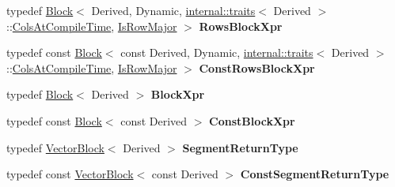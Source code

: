 \begin{DoxyCompactItemize}
\item 
\mbox{\label{class_eigen_1_1_dense_base_ad79e2820eb2d754fd40eff7f0e3609e3}} 
typedef \mbox{\hyperlink{class_eigen_1_1_block}{Block}}$<$ Derived, Dynamic, \mbox{\hyperlink{struct_eigen_1_1internal_1_1traits}{internal\+::traits}}$<$ Derived $>$\+::\mbox{\hyperlink{class_eigen_1_1_dense_base_a86241c772c74c04eeeb0480b99c5ab77a787f85fd67ee5985917eb2cef6e70441}{Cols\+At\+Compile\+Time}}, \mbox{\hyperlink{class_eigen_1_1_dense_base_a86241c772c74c04eeeb0480b99c5ab77a406b6af91d61d348ba1c9764bdd66008}{Is\+Row\+Major}} $>$ {\bfseries Rows\+Block\+Xpr}
\item 
\mbox{\label{class_eigen_1_1_dense_base_aa7758acb8661ab4b3e7be108ab5f8380}} 
typedef const \mbox{\hyperlink{class_eigen_1_1_block}{Block}}$<$ const Derived, Dynamic, \mbox{\hyperlink{struct_eigen_1_1internal_1_1traits}{internal\+::traits}}$<$ Derived $>$\+::\mbox{\hyperlink{class_eigen_1_1_dense_base_a86241c772c74c04eeeb0480b99c5ab77a787f85fd67ee5985917eb2cef6e70441}{Cols\+At\+Compile\+Time}}, \mbox{\hyperlink{class_eigen_1_1_dense_base_a86241c772c74c04eeeb0480b99c5ab77a406b6af91d61d348ba1c9764bdd66008}{Is\+Row\+Major}} $>$ {\bfseries Const\+Rows\+Block\+Xpr}
\item 
\mbox{\label{class_eigen_1_1_dense_base_a73a0ff2ad5a52e67ea44242f9beb122a}} 
typedef \mbox{\hyperlink{class_eigen_1_1_block}{Block}}$<$ Derived $>$ {\bfseries Block\+Xpr}
\item 
\mbox{\label{class_eigen_1_1_dense_base_a358d1654d234e4f7b8fc7d289c4f0597}} 
typedef const \mbox{\hyperlink{class_eigen_1_1_block}{Block}}$<$ const Derived $>$ {\bfseries Const\+Block\+Xpr}
\item 
\mbox{\label{class_eigen_1_1_dense_base_a42519f2e9d1a0408ae119050971b4c0f}} 
typedef \mbox{\hyperlink{class_eigen_1_1_vector_block}{Vector\+Block}}$<$ Derived $>$ {\bfseries Segment\+Return\+Type}
\item 
\mbox{\label{class_eigen_1_1_dense_base_a44f2b8d571ed158bb8b8cec0314090c3}} 
typedef const \mbox{\hyperlink{class_eigen_1_1_vector_block}{Vector\+Block}}$<$ const Derived $>$ {\bfseries Const\+Segment\+Return\+Type}
\end{DoxyCompactItemize}
